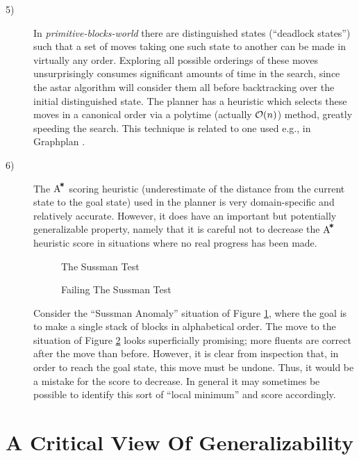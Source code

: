 \documentclass{article}
\newcommand{\sbw}{{\em primitive-blocks-world}}
\newcommand{\astar}{{$\mbox{A}^{\!\mbox{\tt *}}$}}
\newcommand{\bigO}{{\cal O}}
\begin{document}
\begin{description}
\item[5)]
In \sbw{} there are distinguished
states (``deadlock states'') such that a set of moves taking one such state
to another can be made in virtually any order.  Exploring
all possible orderings of these moves unsurprisingly consumes
significant amounts of time in the search, since the astar algorithm
will consider them all before backtracking over the initial
distinguished state.  The planner has a heuristic which selects
these moves in a canonical order via a polytime (actually $\bigO(n)$)
method, greatly speeding the search.  This technique is related
to one used e.g., in {\sc Graphplan} \cite{blum-furst}.

\item[6)]
The \astar{} scoring heuristic (underestimate of the distance from the
current state to the goal state) used in the planner is
very domain-specific and relatively accurate.
However, it does have an important
but potentially generalizable property, namely that 
it is careful not to decrease the \astar{} heuristic score in situations
where no real progress has been made.

\begin{figure}
\centering

\caption{The Sussman Test}
\label{false-progress-a}
\end{figure}

\begin{figure}
\centering

\caption{Failing The Sussman Test}
\label{false-progress-b}
\end{figure}

Consider the ``Sussman Anomaly'' situation of Figure
\ref{false-progress-a}, where the goal is to make a single
stack of blocks in alphabetical order.  The move to the
situation of Figure \ref{false-progress-b} looks superficially
promising; more fluents are correct after the move than
before.  However, it is clear from inspection that, in order
to reach the goal state, this move must be undone.  Thus, it
would be a mistake for the score to decrease.  In general it
may sometimes be possible to identify this sort of ``local
minimum'' and score accordingly.
\end{description}

\section{A Critical View Of Generalizability}
\label{section-not-generalizable}
\end{document}
